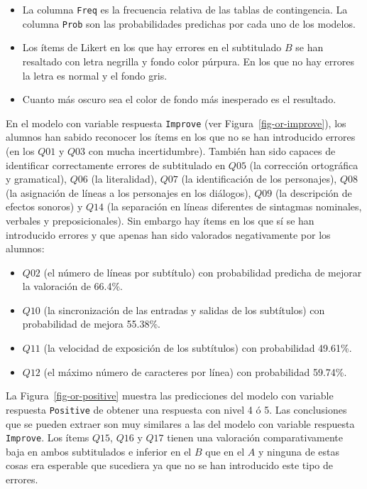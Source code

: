 \documentclass[
  12pt,
  a4paper,
  extrafontsizes,
  onecolumn,
  openright,
  table]{memoir}
\providecommand{\tightlist}{%
  \setlength{\itemsep}{0pt}\setlength{\parskip}{0pt}}\usepackage{longtable,booktabs,array}
\begin{document}
\begin{itemize}
\tightlist
\item
  La columna \texttt{Freq} es la frecuencia relativa de las tablas de
  contingencia. La columna \texttt{Prob} son las probabilidades
  predichas por cada uno de los modelos.
\item
  Los ítems de Likert en los que hay errores en el subtitulado \(B\) se
  han resaltado con letra negrilla y fondo color púrpura. En los que no
  hay errores la letra es normal y el fondo gris.
\item
  Cuanto más oscuro sea el color de fondo más inesperado es el
  resultado.
\end{itemize}

En el modelo con variable respuesta \texttt{Improve} (ver
Figura~\ref{fig-or-improve}), los alumnos han sabido reconocer los ítems
en los que no se han introducido errores (en los \(Q01\) y \(Q03\) con
mucha incertidumbre). También han sido capaces de identificar
correctamente errores de subtitulado en \(Q05\) (la corrección
ortográfica y gramatical), \(Q06\) (la literalidad), \(Q07\) (la
identificación de los personajes), \(Q08\) (la asignación de líneas a
los personajes en los diálogos), \(Q09\) (la descripción de efectos
sonoros) y \(Q14\) (la separación en líneas diferentes de sintagmas
nominales, verbales y preposicionales). Sin embargo hay ítems en los que
sí se han introducido errores y que apenas han sido valorados
negativamente por los alumnos:

\begin{itemize}
\tightlist
\item
  \(Q02\) (el número de líneas por subtítulo) con probabilidad predicha
  de mejorar la valoración de 66.4\%.
\item
  \(Q10\) (la sincronización de las entradas y salidas de los
  subtítulos) con probabilidad de mejora 55.38\%.
\item
  \(Q11\) (la velocidad de exposición de los subtítulos) con
  probabilidad 49.61\%.
\item
  \(Q12\) (el máximo número de caracteres por línea) con probabilidad
  59.74\%.
\end{itemize}

La Figura~\ref{fig-or-positive} muestra las predicciones del modelo con
variable respuesta \texttt{Positive} de obtener una respuesta con nivel
4 ó 5. Las conclusiones que se pueden extraer son muy similares a las
del modelo con variable respuesta \texttt{Improve}. Los ítems \(Q15\),
\(Q16\) y \(Q17\) tienen una valoración comparativamente baja en ambos
subtitulados e inferior en el \(B\) que en el \(A\) y ninguna de estas
cosas era esperable que sucediera ya que no se han introducido este tipo
de errores.
\end{document}
